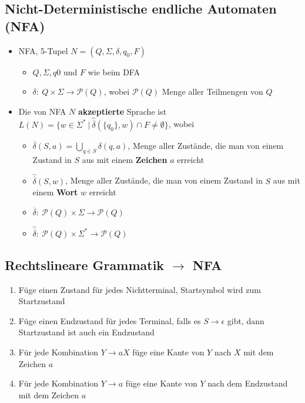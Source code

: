 \documentclass[ieeetran]{article}
\begin{document}
\subsection{Nicht-Deterministische endliche Automaten (NFA)} %
\label{sub:nicht_deterministische_endliche_automaten_nFA_}
\begin{itemize}
  \item NFA, 5-Tupel $N = (Q,\Sigma,\delta,q_0,F)$
	  \begin{itemize}
	    \item $Q, \Sigma, q0$ und $F$ wie beim DFA
	    \item $\delta: \ Q \times \Sigma \rightarrow \mathcal{P}(Q)$, wobei $\mathcal{P}(Q)$ Menge aller Teilmengen von $Q$
	  \end{itemize}


  \item Die von NFA $N$ \textbf{akzeptierte} Sprache ist $L(N) = \{ w \in \Sigma^* \ | \ \hat{\overline{\delta}}(\{q_0\},w) \cap F \neq \emptyset \}$, wobei
	  \begin{itemize}
		  \item $\overline{\delta}(S,a) = \bigcup_{q \in S}\delta(q,a)$, Menge aller Zustände, die man von einem Zustand in $S$ aus mit einem \textbf{Zeichen} $a$ erreicht
		  \item $\hat{\overline{\delta}}(S,w)$, Menge aller Zustände, die man von einem Zustand in $S$ aus mit einem \textbf{Wort} $w$ erreicht
		  \item $\overline{\delta}: \ \mathcal{P}(Q) \times \Sigma \rightarrow \mathcal{P}(Q)$
		  \item $\hat{\overline{\delta}}: \ \mathcal{P}(Q) \times \Sigma^* \rightarrow \mathcal{P}(Q)$	  
\end{itemize}
\end{itemize}

\subsection{Rechtslineare Grammatik $\rightarrow$ NFA} %
\label{sub:nFA_rechtslineare_grammatik}
\begin{enumerate}
	\item Füge einen Zustand für jedes Nichtterminal, Startsymbol wird zum Startzustand
	\item Füge einen Endzustand für jedes Terminal, falls es $S \rightarrow \epsilon$ gibt, dann Startzustand ist auch ein Endzustand
	\item Für jede Kombination $Y \rightarrow aX$ füge eine Kante von $Y$ nach $X$ mit dem Zeichen $a$
	\item Für jede Kombination $Y \rightarrow a$ füge eine Kante von $Y$ nach dem Endzustand mit dem Zeichen $a$
\end{enumerate}
\end{document}
